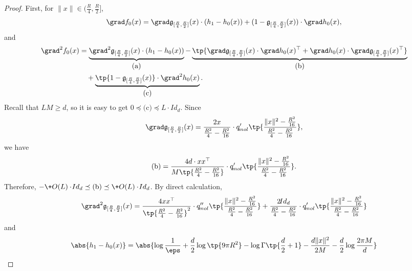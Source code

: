 \begin{proof}
    First, for $\|x\|\in (\frac{R}{4},\frac{R}{2}]$,
    \[
        \grad f_0(x) = \grad \mathfrak{g}_{[\frac{R}{4},\frac{R}{2}]}(x) \cdot (h_1 - h_0(x) ) + (1-\mathfrak{g}_{[\frac{R}{4},\frac{R}{2}]}(x))\cdot \grad h_0(x), 
    \]
    and
    \begin{align*}
        \grad^2 f_0(x) &= \underbrace{\grad^2 \mathfrak{g}_{[\frac{R}{4},\frac{R}{2}]}(x) \cdot (h_1 - h_0(x))}_{\mbox{(a)}} - \underbrace{\tp{\grad \mathfrak{g}_{[\frac{R}{4},\frac{R}{2}]}(x) \cdot \grad h_0(x)^{\top} +  \grad h_0(x)\cdot \grad \mathfrak{g}_{[\frac{R}{4},\frac{R}{2}]}(x)^{\top}}}_{\mbox{(b)}}\\
        &\quad + \underbrace{ \tp{1-\mathfrak{g}_{[\frac{R}{4},\frac{R}{2}]}(x)}\cdot \grad^2 h_0(x)}_{\mbox{(c)}}.
        \end{align*}
    Recall that $LM\geq d$, so it is easy to get $0\preceq \mbox{(c)}\preceq L\cdot \!{Id}_d$. Since 
    \[
        \grad \mathfrak{g}_{[\frac{R}{4},\frac{R}{2}]}(x) = \frac{2x}{\frac{R^2}{4} - \frac{R^2}{16}} \cdot q_{\!{mol}}'\tp{\frac{ \|x\|^2- \frac{R^2}{16}}{\frac{R^2}{4} - \frac{R^2}{16}}},
    \]
    we have
    \[
        \mbox{(b)} = \frac{4d \cdot xx^{\top}}{M\tp{\frac{R^2}{4} - \frac{R^2}{16}}} \cdot q_{\!{mol}}'\tp{\frac{ \|x\|^2- \frac{R^2}{16}}{\frac{R^2}{4} - \frac{R^2}{16}}}.
    \]
    Therefore, $-\+O(L)\cdot\!{Id}_d \preceq \mbox{(b)} \preceq \+O(L)\cdot\!{Id}_d$.
    By direct calculation,
    \[
        \grad^2 \mathfrak{g}_{[\frac{R}{4},\frac{R}{2}]}(x) = \frac{4xx^{\top}}{\tp{\frac{R^2}{4} - \frac{R^2}{16}}^2} \cdot q''_{\!{mol}}\tp{\frac{ \|x\|^2- \frac{R^2}{16}}{\frac{R^2}{4} - \frac{R^2}{16}}} + \frac{2\!{Id}_d}{\frac{R^2}{4} - \frac{R^2}{16}} \cdot q'_{\!{mol}}\tp{\frac{ \|x\|^2- \frac{R^2}{16}}{\frac{R^2}{4} - \frac{R^2}{16}}}
    \]
    and 
    \begin{align}
        \abs{h_1 - h_0(x)} &= \abs{\log \frac{1}{\eps} + \frac{d}{2}\log\tp{9\pi R^2} - \log \Gamma\tp{\frac{d}{2}+1} - \frac{d\|x\|^2}{2M} - \frac{d}{2}\log \frac{2\pi M}{d}} \notag\\

\end{align}
\end{proof}
